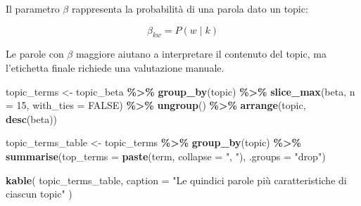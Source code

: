 \documentclass[
]{article}
\newenvironment{Shaded}{\begin{snugshade}}{\end{snugshade}}
\newcommand{\AttributeTok}[1]{\textcolor[rgb]{0.13,0.29,0.53}{#1}}
\newcommand{\ConstantTok}[1]{\textcolor[rgb]{0.56,0.35,0.01}{#1}}
\newcommand{\DecValTok}[1]{\textcolor[rgb]{0.00,0.00,0.81}{#1}}
\newcommand{\FunctionTok}[1]{\textcolor[rgb]{0.13,0.29,0.53}{\textbf{#1}}}
\newcommand{\NormalTok}[1]{#1}
\newcommand{\OtherTok}[1]{\textcolor[rgb]{0.56,0.35,0.01}{#1}}
\newcommand{\SpecialCharTok}[1]{\textcolor[rgb]{0.81,0.36,0.00}{\textbf{#1}}}
\newcommand{\StringTok}[1]{\textcolor[rgb]{0.31,0.60,0.02}{#1}}
\begin{document}
Il parametro \(\beta\) rappresenta la probabilità di una parola dato un
topic:

\[
\beta_{kw}=P(w\mid k)
\]

Le parole con \(\beta\) maggiore aiutano a interpretare il contenuto del
topic, ma l'etichetta finale richiede una valutazione manuale.

\begin{Shaded}
\begin{Highlighting}[]
\NormalTok{topic\_terms }\OtherTok{\textless{}{-}}\NormalTok{ topic\_beta }\SpecialCharTok{\%\textgreater{}\%}
  \FunctionTok{group\_by}\NormalTok{(topic) }\SpecialCharTok{\%\textgreater{}\%}
  \FunctionTok{slice\_max}\NormalTok{(beta, }\AttributeTok{n =} \DecValTok{15}\NormalTok{, }\AttributeTok{with\_ties =} \ConstantTok{FALSE}\NormalTok{) }\SpecialCharTok{\%\textgreater{}\%}
  \FunctionTok{ungroup}\NormalTok{() }\SpecialCharTok{\%\textgreater{}\%}
  \FunctionTok{arrange}\NormalTok{(topic, }\FunctionTok{desc}\NormalTok{(beta))}

\NormalTok{topic\_terms\_table }\OtherTok{\textless{}{-}}\NormalTok{ topic\_terms }\SpecialCharTok{\%\textgreater{}\%}
  \FunctionTok{group\_by}\NormalTok{(topic) }\SpecialCharTok{\%\textgreater{}\%}
  \FunctionTok{summarise}\NormalTok{(}\AttributeTok{top\_terms =} \FunctionTok{paste}\NormalTok{(term, }\AttributeTok{collapse =} \StringTok{", "}\NormalTok{), }\AttributeTok{.groups =} \StringTok{"drop"}\NormalTok{)}

\FunctionTok{kable}\NormalTok{(}
\NormalTok{  topic\_terms\_table,}
  \AttributeTok{caption =} \StringTok{"Le quindici parole più caratteristiche di ciascun topic"}
\NormalTok{)}
\end{Highlighting}
\end{Shaded}
\end{document}
